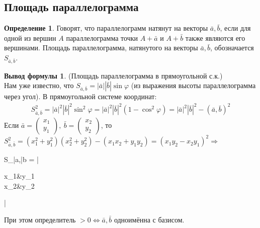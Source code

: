 \documentclass[a4paper, 12pt]{article}
\renewcommand{\phi}{\varphi}
\theoremstyle{definition}
\newtheorem*{definition}{Определение}
\newtheorem*{formula}{Вывод формулы}
\newenvironment{boxedalign*}
  {\begin{equation*}\begin{lrbox}{\boxedalignbox}$\begin{aligned}}
  {\end{aligned}$\end{lrbox}\fbox{\usebox{\boxedalignbox}}\end{equation*}}
\begin{document}
	\subsection{Площадь параллелограмма}
	\begin{definition}
		Говорят, что параллелограмм натянут на векторы $\bar{a}, \bar{b}$, если для одной из вершин $A$ параллелограмма точки $A + \bar{a}$ и $A + \bar{b}$ также являются его вершинами. Площадь параллелограмма, натянутого на векторы $\bar{a}, \bar{b}$, обозначается $S_{\bar{a},\bar{b}}$.
	\end{definition}
	\begin{formula}(Площадь параллелограмма в прямоугольной с.к.)\\
		Нам уже известно, что $S_{\bar{a},\bar{b}} = |\bar{a}||\bar{b}|\sin\phi$ (из выражения высоты параллелограмма через угол). В прямоугольной системе координат:\begin{align*}
			S_{\bar{a},\bar{b}}^2 = |\bar{a}|^2|\bar{b}|^2\sin^2\phi = |\bar{a}|^2|\bar{b}|^2(1 - \cos^2\phi) = |\bar{a}|^2|\bar{b}|^2 - (\bar{a}, \bar{b})^2
		\end{align*}
		Если $\bar{a} = \begin{pmatrix} x_1 \\ y_1 \end{pmatrix}, \ \bar{b} = \begin{pmatrix} x_2 \\ y_2 \end{pmatrix}$, то $S_{\bar{a},\bar{b}}^2 = (x_1^2 + y_1^2)(x_2^2 + y_2^2) - (x_1x_2 + y_1y_2) = (x_1y_2 - x_2y_1)^2 \Rightarrow$ \begin{boxedalign*}S_{\bar{a},\bar{b}} = |\begin{vmatrix} x_1&y_1\\x_2&y_2 \end{vmatrix}|\end{boxedalign*}
		При этом определитель $>0 \Leftrightarrow \bar{a}, \bar{b}$ одноимённа с базисом.
	\end{formula}
\end{document}
